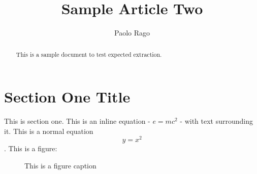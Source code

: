 \documentclass{article}
\begin{document}
\title{Sample Article Two}
\author{Paolo Rago}
\date{}
\maketitle
\begin{abstract}
This is a sample document to test expected extraction.
\end{abstract}
\section{Section One Title}
This is section one. This is an inline equation - $e=mc^2$ - with text surrounding it. This is a normal equation
\begin{equation}
y=x^2
\end{equation}
. This is a figure:
\begin{figure}
\caption{This is a figure caption}
\end{figure}
\end{document}
